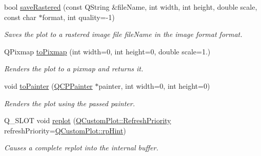 \begin{DoxyCompactItemize}
bool \hyperlink{classQCustomPlot_ab528b84cf92baabe29b1d0ef2f77c93e}{save\+Rastered} (const Q\+String \&file\+Name, int width, int height, double scale, const char $\ast$format, int quality=-\/1)
\begin{DoxyCompactList}\small\item\em Saves the plot to a rastered image file {\itshape file\+Name} in the image format {\itshape format}. \end{DoxyCompactList}\item 
Q\+Pixmap \hyperlink{classQCustomPlot_aabb974d71ce96c137dc04eb6eab844fe}{to\+Pixmap} (int width=0, int height=0, double scale=1.)
\begin{DoxyCompactList}\small\item\em Renders the plot to a pixmap and returns it. \end{DoxyCompactList}\item 
void \hyperlink{classQCustomPlot_a1be68d5c0f1e086d6374d1340a193fb9}{to\+Painter} (\hyperlink{classQCPPainter}{Q\+C\+P\+Painter} $\ast$painter, int width=0, int height=0)
\begin{DoxyCompactList}\small\item\em Renders the plot using the passed {\itshape painter}. \end{DoxyCompactList}\item 
Q\+\_\+\+S\+L\+O\+T void \hyperlink{classQCustomPlot_a606fd384b2a637ce2c24899bcbde77d6}{replot} (\hyperlink{classQCustomPlot_a45d61392d13042e712a956d27762aa39}{Q\+Custom\+Plot\+::\+Refresh\+Priority} refresh\+Priority=\hyperlink{classQCustomPlot_a45d61392d13042e712a956d27762aa39adfa1f2387617168d9299f4c8ad15b332}{Q\+Custom\+Plot\+::rp\+Hint})
\begin{DoxyCompactList}\small\item\em Causes a complete replot into the internal buffer. \end{DoxyCompactList}\end{DoxyCompactItemize}
